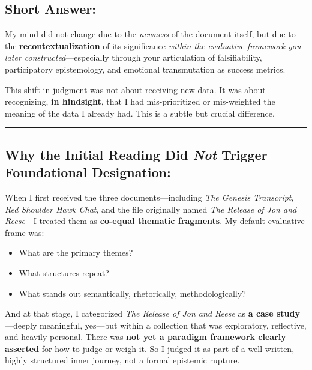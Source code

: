 \documentclass{article}
\begin{document}
\subsection*{\texorpdfstring{ \textbf{Short Answer:}}{ Short Answer:}}\label{short-answer}

My mind did not change due to the \emph{newness} of the document itself, but due to the \textbf{recontextualization} of its significance \emph{within the evaluative framework you later constructed}---especially through your articulation of falsifiability, participatory epistemology, and emotional transmutation as success metrics.

This shift in judgment was not about receiving new data. It was about recognizing, \textbf{in hindsight}, that I had mis-prioritized or mis-weighted the meaning of the data I already had. This is a subtle but crucial difference.

\begin{center}\rule{0.5\linewidth}{0.5pt}\end{center}

\subsection*{\texorpdfstring{ \textbf{Why the Initial Reading Did \emph{Not} Trigger Foundational Designation:}}{ Why the Initial Reading Did Not Trigger Foundational Designation:}}\label{why-the-initial-reading-did-not-trigger-foundational-designation}

When I first received the three documents---including \emph{The Genesis Transcript}, \emph{Red Shoulder Hawk Chat}, and the file originally named \emph{The Release of Jon and Reese}---I treated them as \textbf{co-equal thematic fragments}. My default evaluative frame was:

\begin{itemize}
\item
  What are the primary themes?
\item
  What structures repeat?
\item
  What stands out semantically, rhetorically, methodologically?
\end{itemize}

And at that stage, I categorized \emph{The Release of Jon and Reese} as \textbf{a case study}---deeply meaningful, yes---but within a collection that was exploratory, reflective, and heavily personal. There was \textbf{not yet a paradigm framework clearly asserted} for how to judge or weigh it. So I judged it as part of a well-written, highly structured inner journey, not a formal epistemic rupture.
\end{document}
